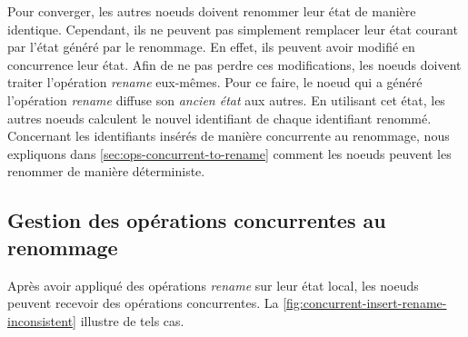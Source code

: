 \documentclass[12pt]{thesul}
\begin{document}
Pour converger, les autres noeuds doivent renommer leur état de manière identique.
Cependant, ils ne peuvent pas simplement remplacer leur état courant par l'état généré par le renommage.
En effet, ils peuvent avoir modifié en concurrence leur état.
Afin de ne pas perdre ces modifications, les noeuds doivent traiter l'opération \emph{rename} eux-mêmes.
Pour ce faire, le noeud qui a généré l'opération \emph{rename} diffuse son \emph{ancien état} aux autres.
En utilisant cet état, les autres noeuds calculent le nouvel identifiant de chaque identifiant renommé.
Concernant les identifiants insérés de manière concurrente au renommage, nous expliquons dans \autoref{sec:ops-concurrent-to-rename} comment les noeuds peuvent les renommer de manière déterministe.

\subsection{Gestion des opérations concurrentes au renommage}

\label{sec:ops-concurrent-to-rename}

Après avoir appliqué des opérations \emph{rename} sur leur état local, les noeuds peuvent recevoir des opérations concurrentes.
La \autoref{fig:concurrent-insert-rename-inconsistent} illustre de tels cas.
\end{document}

